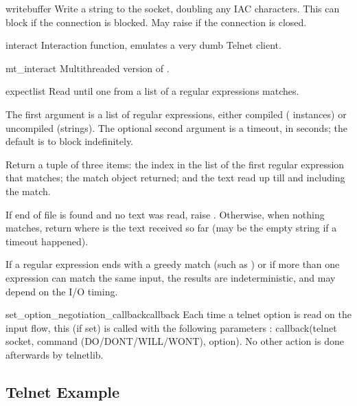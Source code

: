 \begin{methoddesc}{write}{buffer}
Write a string to the socket, doubling any IAC characters.
This can block if the connection is blocked.  May raise
 if the connection is closed.
\end{methoddesc}

\begin{methoddesc}{interact}{}
Interaction function, emulates a very dumb Telnet client.
\end{methoddesc}

\begin{methoddesc}{mt_interact}{}
Multithreaded version of .
\end{methoddesc}

\begin{methoddesc}{expect}{list}
Read until one from a list of a regular expressions matches.

The first argument is a list of regular expressions, either
compiled ( instances) or uncompiled (strings).
The optional second argument is a timeout, in seconds; the default
is to block indefinitely.

Return a tuple of three items: the index in the list of the
first regular expression that matches; the match object
returned; and the text read up till and including the match.

If end of file is found and no text was read, raise
.  Otherwise, when nothing matches, return
 where  is the text received so
far (may be the empty string if a timeout happened).

If a regular expression ends with a greedy match (such as )
or if more than one expression can match the same input, the
results are indeterministic, and may depend on the I/O timing.
\end{methoddesc}

\begin{methoddesc}{set_option_negotiation_callback}{callback}
Each time a telnet option is read on the input flow, this
 (if set) is called with the following parameters :
callback(telnet socket, command (DO/DONT/WILL/WONT), option).  No other
action is done afterwards by telnetlib.
\end{methoddesc}


\subsection{Telnet Example \label{telnet-example}}

